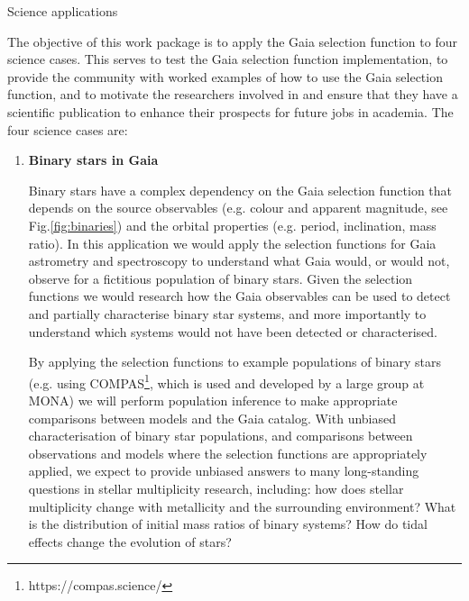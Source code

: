 \begin{workpackage}{Science applications}
  \label{wp:scienceappl}
  \wpend{\duration} %

  \makewptable %

  \begin{wpobjectives}
    The objective of this work package is to apply the Gaia selection function to four science cases. This serves to test the Gaia selection function implementation, to provide the community with worked examples of how to use the Gaia selection function, and to motivate the researchers involved in {\acro} and ensure that they have a scientific publication to enhance their prospects for future jobs in academia. The four science cases are:
    \begin{enumerate}
      \item \textbf{Binary stars in Gaia}{
        Binary stars have a complex dependency on the Gaia selection function that depends on the source observables (e.g. colour and apparent magnitude, see Fig.\ref{fig:binaries}) and the orbital properties (e.g. period, inclination, mass ratio). In this application we would apply the selection functions for Gaia astrometry and spectroscopy to understand what Gaia would, or would not, observe for a fictitious population of binary stars. Given the selection functions we would research how the Gaia observables can be used to detect and partially characterise binary star systems, and more importantly to understand which systems would not have been detected or characterised. 

        By applying the selection functions to example populations of binary stars (e.g. using COMPAS\footnote{https://compas.science/}, which is used and developed by a large group at MONA) we will perform population inference to make appropriate comparisons between models and the Gaia catalog. With unbiased characterisation of binary star populations, and comparisons between observations and models where the selection functions are appropriately applied, we expect to provide unbiased answers to many long-standing questions in stellar multiplicity research, including: how does stellar multiplicity change with metallicity and the surrounding environment? What is the distribution of initial mass ratios of binary systems? How do tidal effects change the evolution of stars? 

}
\end{enumerate}
\end{wpobjectives}
\end{workpackage}
